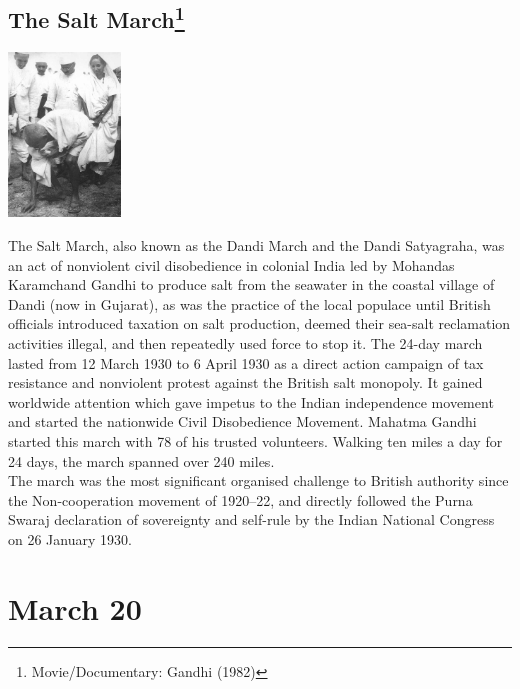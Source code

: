 \documentclass[11pt]{report}
\begin{document}
\subsection{The Salt March\protect\footnote{Movie/Documentary: Gandhi (1982)}}
\vspace{2mm}\begin{center}\includegraphics[width=3cm]{./img/saltMarch.jpg}\end{center}
The Salt March, also known as the Dandi March and the Dandi Satyagraha, was an act of nonviolent civil disobedience in colonial India led by Mohandas Karamchand Gandhi to produce salt from the seawater in the coastal village of Dandi (now in Gujarat), as was the practice of the local populace until British officials introduced taxation on salt production, deemed their sea-salt reclamation activities illegal, and then repeatedly used force to stop it. The 24-day march lasted from 12 March 1930 to 6 April 1930 as a direct action campaign of tax resistance and nonviolent protest against the British salt monopoly. It gained worldwide attention which gave impetus to the Indian independence movement and started the nationwide Civil Disobedience Movement. Mahatma Gandhi started this march with 78 of his trusted volunteers. Walking ten miles a day for 24 days, the march spanned over 240 miles.\\
The march was the most significant organised challenge to British authority since the Non-cooperation movement of 1920–22, and directly followed the Purna Swaraj declaration of sovereignty and self-rule by the Indian National Congress on 26 January 1930.
\section{March 20}
\end{document}
